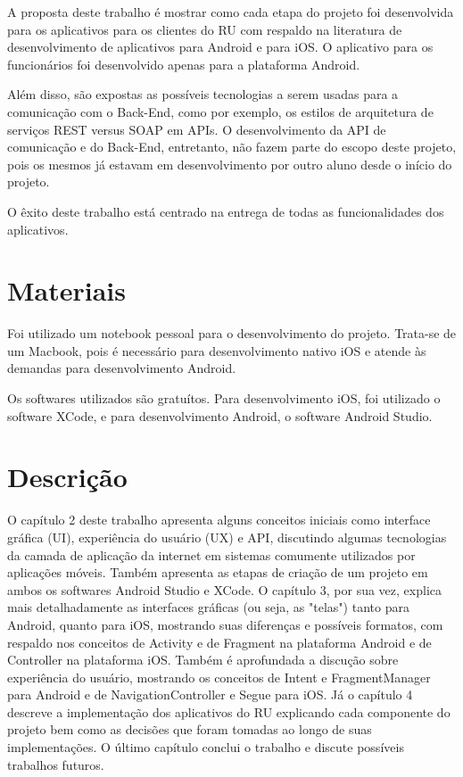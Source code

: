  A proposta deste trabalho é mostrar como cada etapa do projeto foi 
 desenvolvida para os aplicativos para os clientes do RU com respaldo 
 na literatura de desenvolvimento de aplicativos para Android e para iOS.
 O aplicativo para os funcionários foi desenvolvido apenas para a 
 plataforma Android.
 
 Além disso, são expostas as possíveis tecnologias a serem usadas para a 
 comunicação com o Back-End, como por exemplo, os estilos de arquitetura de 
 serviços REST versus SOAP em APIs. O desenvolvimento da 
 API de comunicação e do Back-End, entretanto, não fazem parte do escopo deste projeto, 
 pois os mesmos já estavam em desenvolvimento por outro aluno desde o início do projeto.

O êxito deste trabalho está centrado na entrega de todas as funcionalidades dos 
aplicativos.


\section{Materiais}	
Foi utilizado um notebook pessoal para o desenvolvimento do projeto. Trata-se 
de um Macbook, pois é necessário para desenvolvimento nativo iOS e atende às demandas para 
desenvolvimento Android.

Os softwares utilizados são gratuítos. Para desenvolvimento iOS, foi utilizado o 
software XCode, e para desenvolvimento Android, o software Android Studio.

\section{Descrição}
O capítulo 2 deste trabalho apresenta alguns conceitos iniciais como interface gráfica 
(UI), experiência do usuário (UX) e API, discutindo algumas tecnologias da camada de 
aplicação da internet em sistemas comumente utilizados por aplicações móveis. 
Também apresenta as etapas de criação de um projeto em ambos os softwares Android 
Studio e XCode.
O capítulo 3, por sua vez, explica mais detalhadamente as interfaces gráficas (ou seja, as "telas")
tanto para Android, quanto para iOS, mostrando suas diferenças e possíveis 
formatos, com respaldo nos conceitos de Activity e de Fragment na plataforma Android e de 
Controller na plataforma iOS. Também é aprofundada a discução sobre
 experiência do usuário, mostrando os conceitos de Intent e FragmentManager para Android e de 
 NavigationController e Segue para iOS.
Já o capítulo 4 descreve a implementação dos aplicativos do RU explicando cada 
componente do projeto bem como as decisões que foram tomadas ao longo de suas implementações.
O último capítulo conclui o trabalho e discute possíveis trabalhos futuros.